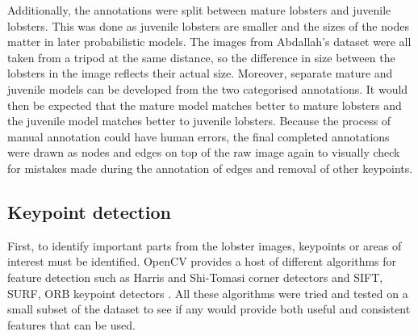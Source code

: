 \noindent
Additionally, the annotations were split between mature lobsters and juvenile lobsters. This was done as juvenile lobsters are smaller and the sizes of the nodes matter in later probabilistic models. The images from Abdallah's dataset were all taken from a tripod at the same distance, so the difference in size between the lobsters in the image reflects their actual size. Moreover, separate mature and juvenile models can be developed from the two categorised annotations. It would then be expected that the mature model matches better to mature lobsters and the juvenile model matches better to juvenile lobsters. 
\n
Because the process of manual annotation could have human errors, the final completed annotations were drawn as nodes and edges on top of the raw image again to visually check for mistakes made during the annotation of edges and removal of other keypoints.


\subsection{Keypoint detection}\label{sec:kp-detection}
First, to identify important parts from the lobster images, keypoints or areas of interest must be identified. OpenCV provides a host of different algorithms for feature detection such as Harris and Shi-Tomasi corner detectors and SIFT, SURF, ORB keypoint detectors \cite{opencv-tut1}. All these algorithms were tried and tested on a small subset of the dataset to see if any would provide both useful and consistent features that can be used. 

